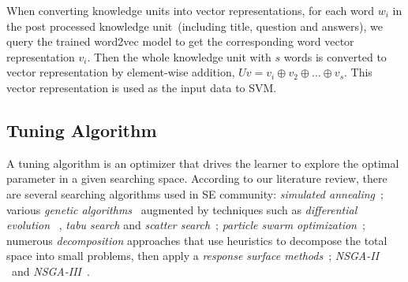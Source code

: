 \documentclass[sigconf,review, anonymous]{acmart}
\theoremstyle{break}
\begin{document}
When converting knowledge units into vector representations, 
for each word $w_i$ in the post processed knowledge unit~(including title, question and answers),
we query the trained word2vec model to get the corresponding word vector representation $v_i$.
Then the whole knowledge unit with $s$ words
is converted to vector representation by element-wise addition, $Uv = v_i \oplus v_2 \oplus...\oplus v_s $. 
This vector representation is used
as the input data to SVM.




\subsection{Tuning Algorithm}

A tuning algorithm is an optimizer that  drives the learner to explore
the optimal parameter in a given searching space. According to our
literature review, there are several searching algorithms used in 
SE community:{\em 
simulated annealing}~\cite{feather2002converging,menzies2007data};
 various {\em genetic algorithms}~\cite{jones1996automatic,harman2007current, arcuri2011parameter} augmented by
techniques such as {\em differential evolution}
~\cite{storn1997differential, fu2016tuning, fu2016differential,chaves2015differential,agrawal2016wrong}, 
{\em tabu search} and {\em scatter search}~\cite{beausoleil2006moss,molina2007sspmo,corazza2013using};
{\em particle swarm optimization}~\cite{windisch2007applying}; 
numerous {\em decomposition} approaches that use
    heuristics to decompose the total space into   small problems,   then apply a
    {\em response surface methods}~\cite{krall2015gale};
     {\em NSGA-II} ~\cite{zhang2007multi}and {\em NSGA-III}~\cite{mkaouer2014high}.
\end{document}
